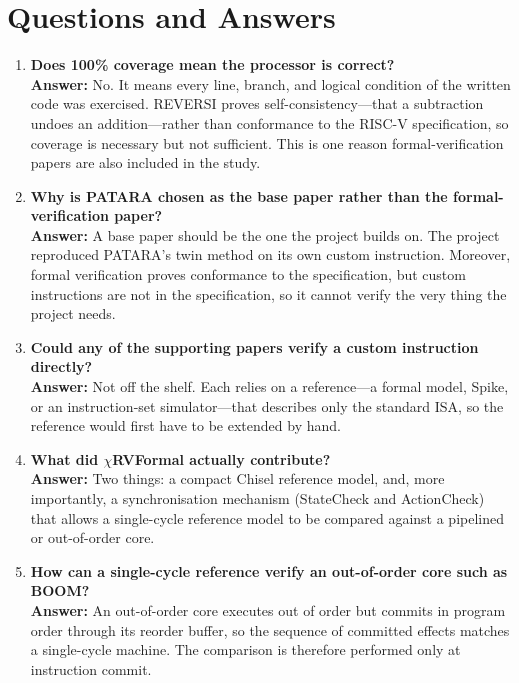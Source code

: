 \documentclass[12pt,a4paper]{report}
\begin{document}
\chapter*{Questions and Answers}

\begin{enumerate}[leftmargin=*,itemsep=10pt]
\item \textbf{Does 100\% coverage mean the processor is correct?}\\
\textbf{Answer:} No. It means every line, branch, and logical condition of the written code
was exercised. REVERSI proves self-consistency---that a subtraction undoes an
addition---rather than conformance to the RISC-V specification, so coverage is necessary but
not sufficient. This is one reason formal-verification papers are also included in the study.

\item \textbf{Why is PATARA chosen as the base paper rather than the formal-verification
paper?}\\
\textbf{Answer:} A base paper should be the one the project builds on. The project reproduced
PATARA's twin method on its own custom instruction. Moreover, formal verification proves
conformance to the specification, but custom instructions are not in the specification, so it
cannot verify the very thing the project needs.

\item \textbf{Could any of the supporting papers verify a custom instruction directly?}\\
\textbf{Answer:} Not off the shelf. Each relies on a reference---a formal model, Spike, or an
instruction-set simulator---that describes only the standard ISA, so the reference would
first have to be extended by hand.

\item \textbf{What did $\chi$RVFormal actually contribute?}\\
\textbf{Answer:} Two things: a compact Chisel reference model, and, more importantly, a
synchronisation mechanism (StateCheck and ActionCheck) that allows a single-cycle reference
model to be compared against a pipelined or out-of-order core.

\item \textbf{How can a single-cycle reference verify an out-of-order core such as BOOM?}\\
\textbf{Answer:} An out-of-order core executes out of order but commits in program order
through its reorder buffer, so the sequence of committed effects matches a single-cycle
machine. The comparison is therefore performed only at instruction commit.
\end{enumerate}
\end{document}

